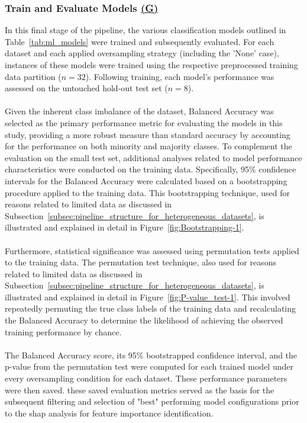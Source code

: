 \documentclass[12pt,a4paper]{report}
\begin{document}
\subsubsection*{Train and Evaluate Models \hyperref[fig:pipeline-2]{(G)}}
In this final stage of the pipeline, the various classification models outlined in Table~\ref{tab:ml_models} were trained and subsequently evaluated. For each dataset and each applied oversampling strategy (including the 'None' case), instances of these models were trained using the respective preprocessed training data partition ($n=32$). Following training, each model's performance was assessed on the untouched hold-out test set ($n=8$).\\
\\
Given the inherent class imbalance of the dataset, Balanced Accuracy was selected as the primary performance metric for evaluating the models in this study, providing a more robust measure than standard accuracy by accounting for the performance on both minority and majority classes. To complement the evaluation on the small test set, additional analyses related to model performance characteristics were conducted on the training data. Specifically, 95\% confidence intervals for the Balanced Accuracy were calculated based on a bootstrapping procedure applied to the training data. This bootstrapping technique, used for reasons related to limited data as discussed in Subsection~\ref{subsec:pipeline_structure_for_heterogeneous_datasets}, is illustrated and explained in detail in Figure~\ref{fig:Bootstrapping-1}.\\
\\
Furthermore, statistical significance was assessed using permutation tests applied to the training data. The permutation test technique, also used for reasons related to limited data as discussed in Subsection~\ref{subsec:pipeline_structure_for_heterogeneous_datasets}, is illustrated and explained in detail in Figure~\ref{fig:P-value_test-1}. This involved repeatedly permuting the true class labels of the training data and recalculating the Balanced Accuracy to determine the likelihood of achieving the observed training performance by chance.\\
\\
The Balanced Accuracy score, its 95\% bootstrapped confidence interval, and the p-value from the permutation test were computed for each trained model under every oversampling condition for each dataset. These performance parameters were then saved. these saved evaluation metrics served as the basis for the subsequent filtering and selection of "best" performing model configurations prior to the \gls{shap} analysis for feature importance identification.
 
\end{document}
